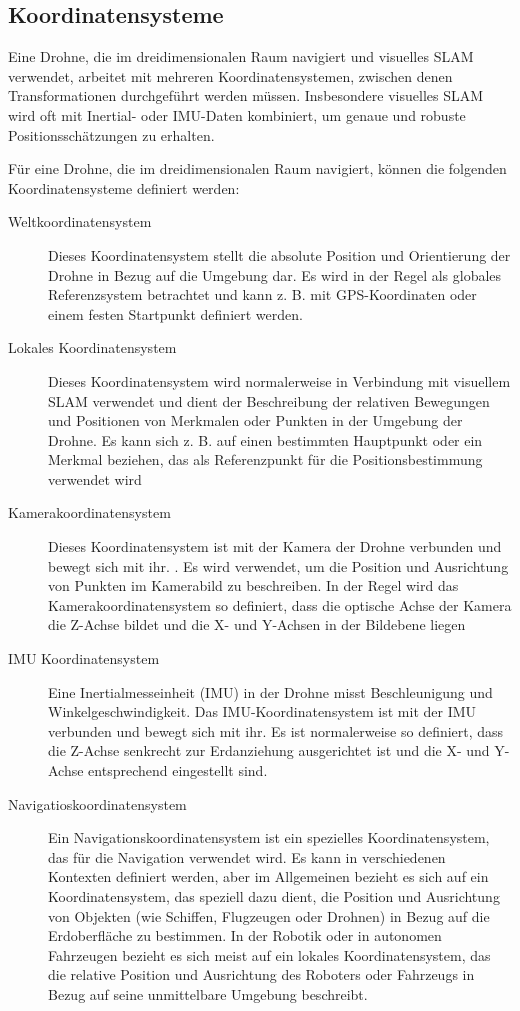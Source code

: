 \subsection{Koordinatensysteme}

Eine Drohne, die im dreidimensionalen Raum navigiert und visuelles SLAM verwendet, arbeitet mit mehreren Koordinatensystemen, zwischen denen Transformationen durchgeführt werden müssen. Insbesondere visuelles SLAM wird oft mit Inertial- oder IMU-Daten kombiniert, um genaue und robuste Positionsschätzungen zu erhalten.

Für eine Drohne, die im dreidimensionalen Raum navigiert, können die folgenden Koordinatensysteme definiert werden:

\begin{description}
    \item[Weltkoordinatensystem]{Dieses Koordinatensystem stellt die absolute Position und Orientierung der Drohne in Bezug auf die Umgebung dar. Es wird in der Regel als globales Referenzsystem betrachtet und kann z. B. mit \ac{GPS}-Koordinaten oder einem festen Startpunkt definiert werden.}
    \item[Lokales Koordinatensystem]{Dieses Koordinatensystem wird normalerweise in Verbindung mit visuellem SLAM verwendet und dient der Beschreibung der relativen Bewegungen und Positionen von Merkmalen oder Punkten in der Umgebung der Drohne. Es kann sich z. B. auf einen bestimmten Hauptpunkt oder ein Merkmal beziehen, das als Referenzpunkt für die Positionsbestimmung verwendet wird}
    \item[Kamerakoordinatensystem]{
        Dieses Koordinatensystem ist mit der Kamera der Drohne verbunden und bewegt sich mit ihr. . Es wird verwendet, um die Position und Ausrichtung von Punkten im Kamerabild zu beschreiben. In der Regel wird das Kamerakoordinatensystem so definiert, dass die optische Achse der Kamera die Z-Achse bildet und die X- und Y-Achsen in der Bildebene liegen} 
    \item[\ac{IMU} Koordinatensystem]{Eine Inertialmesseinheit (IMU) in der Drohne misst Beschleunigung und Winkelgeschwindigkeit. Das IMU-Koordinatensystem ist mit der IMU verbunden und bewegt sich mit ihr. Es ist normalerweise so definiert, dass die Z-Achse senkrecht zur Erdanziehung ausgerichtet ist und die X- und Y-Achse entsprechend eingestellt sind.} 
    \item[Navigatioskoordinatensystem]{Ein Navigationskoordinatensystem ist ein spezielles Koordinatensystem, das für die Navigation verwendet wird. Es kann in verschiedenen Kontexten definiert werden, aber im Allgemeinen bezieht es sich auf ein Koordinatensystem, das speziell dazu dient, die Position und Ausrichtung von Objekten (wie Schiffen, Flugzeugen oder Drohnen) in Bezug auf die Erdoberfläche zu bestimmen. In der Robotik oder in autonomen Fahrzeugen bezieht es sich meist auf ein lokales Koordinatensystem, das die relative Position und Ausrichtung des Roboters oder Fahrzeugs in Bezug auf seine unmittelbare Umgebung beschreibt.} 
\end{description}


